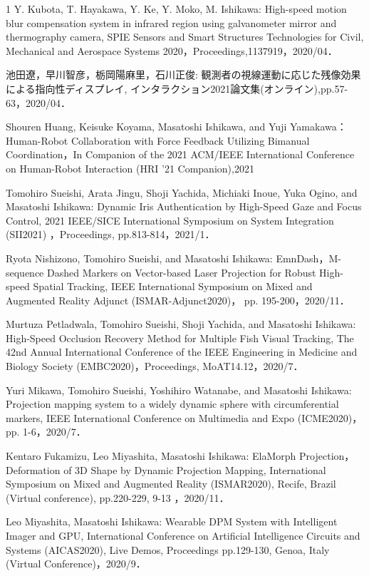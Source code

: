 \begin{査読付}{1}
Y. Kubota, T. Hayakawa, Y. Ke, Y. Moko, M. Ishikawa: High-speed motion blur compensation system in infrared region using galvanometer mirror and thermography camera, SPIE Sensors and Smart Structures Technologies for Civil, Mechanical and Aerospace Systems 2020，Proceedings,1137919，2020/04．

池田遼，早川智彦，栃岡陽麻里，石川正俊: 観測者の視線運動に応じた残像効果による指向性ディスプレイ, インタラクション2021論文集(オンライン),pp.57-63，2020/04．

Shouren Huang, Keisuke Koyama, Masatoshi Ishikawa, and Yuji Yamakawa：Human-Robot Collaboration with Force Feedback Utilizing Bimanual Coordination，In Companion of the 2021 ACM/IEEE International Conference on Human-Robot Interaction (HRI ’21 Companion),2021

Tomohiro Sueishi, Arata Jingu, Shoji Yachida, Michiaki Inoue, Yuka Ogino, and Masatoshi Ishikawa: Dynamic Iris Authentication by High-Speed Gaze and Focus Control, 2021 IEEE/SICE International Symposium on System Integration (SII2021) ，Proceedings, pp.813-814，2021/1．

Ryota Nishizono, Tomohiro Sueishi, and Masatoshi Ishikawa: EmnDash，M-sequence Dashed Markers on Vector-based Laser Projection for Robust High-speed Spatial Tracking, IEEE International Symposium on Mixed and Augmented Reality Adjunct (ISMAR-Adjunct2020)， pp. 195-200，2020/11．

Murtuza Petladwala, Tomohiro Sueishi, Shoji Yachida, and Masatoshi Ishikawa: High-Speed Occlusion Recovery Method for Multiple Fish Visual Tracking, The 42nd Annual International Conference of the IEEE Engineering in Medicine and Biology Society (EMBC2020)，Proceedings, MoAT14.12，2020/7．

Yuri Mikawa, Tomohiro Sueishi, Yoshihiro Watanabe, and Masatoshi Ishikawa: Projection mapping system to a widely dynamic sphere with circumferential markers, IEEE International Conference on Multimedia and Expo (ICME2020)， pp. 1-6，2020/7．

Kentaro Fukamizu, Leo Miyashita, Masatoshi Ishikawa: ElaMorph Projection，Deformation of 3D Shape by Dynamic Projection Mapping, International Symposium on Mixed and Augmented Reality (ISMAR2020), Recife, Brazil (Virtual conference), pp.220-229, 9-13 ，2020/11．

Leo Miyashita, Masatoshi Ishikawa: Wearable DPM System with Intelligent Imager and GPU, International Conference on Artificial Intelligence Circuits and Systems (AICAS2020), Live Demos, Proceedings pp.129-130, Genoa, Italy (Virtual Conference)，2020/9．


\end{査読付}
